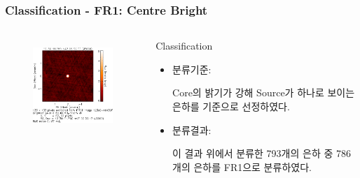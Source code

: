 \documentclass[xcolor={dvipsnames,table}]{beamer}
\newcommand\SM{\fontsize{8}{7.2}\selectfont}
\begin{document}
\begin{frame}
  \frametitle{Classification - FR1: Centre Bright}
  \SM
  \begin{columns}
   \begin{figure}
    \centering
    \includegraphics[width=5cm, height=3.5cm]{core.png}
   \end{figure}
   \centering
   \begin{block}{Classification}
    \begin{itemize}
     \item 분류기준:
     
     Core의 밝기가 강해 Source가 하나로 보이는 은하를 기준으로 선정하였다.
     \vspace{0.2cm}
     \item 분류결과:
     
     이 결과 위에서 분류한 793개의 은하 중 786개의 은하를 FR1으로 분류하였다.
    \end{itemize}
   \end{block}
  \end{columns}
  \vspace{0.2cm}
 
\end{frame}
\end{document}
